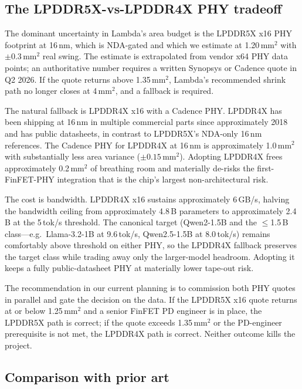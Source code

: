 \documentclass[conference]{IEEEtran}
\begin{document}
\subsection{The LPDDR5X-vs-LPDDR4X PHY tradeoff}

The dominant uncertainty in Lambda's area budget is the LPDDR5X x16 PHY footprint at 16\,nm, which is NDA-gated and which we estimate at 1.20\,mm$^2$ with $\pm 0.3$\,mm$^2$ real swing. The estimate is extrapolated from vendor x64 PHY data points; an authoritative number requires a written Synopsys or Cadence quote in Q2 2026. If the quote returns above 1.35\,mm$^2$, Lambda's recommended shrink path no longer closes at 4\,mm$^2$, and a fallback is required.

The natural fallback is LPDDR4X x16 with a Cadence PHY. LPDDR4X has been shipping at 16\,nm in multiple commercial parts since approximately 2018 and has public datasheets, in contrast to LPDDR5X's NDA-only 16\,nm references. The Cadence PHY for LPDDR4X at 16\,nm is approximately 1.0\,mm$^2$ with substantially less area variance ($\pm 0.15$\,mm$^2$). Adopting LPDDR4X frees approximately 0.2\,mm$^2$ of breathing room and materially de-risks the first-FinFET-PHY integration that is the chip's largest non-architectural risk.

The cost is bandwidth. LPDDR4X x16 sustains approximately 6\,GB/s, halving the bandwidth ceiling from approximately 4.8\,B parameters to approximately 2.4\,B at the 5\,tok/s threshold. The canonical target (Qwen2-1.5B and the $\leq$1.5\,B class---e.g.\ Llama-3.2-1B at 9.6\,tok/s, Qwen2.5-1.5B at 8.0\,tok/s) remains comfortably above threshold on either PHY, so the LPDDR4X fallback preserves the target class while trading away only the larger-model headroom. Adopting it keeps a fully public-datasheet PHY at materially lower tape-out risk.

The recommendation in our current planning is to commission both PHY quotes in parallel and gate the decision on the data. If the LPDDR5X x16 quote returns at or below 1.25\,mm$^2$ and a senior FinFET PD engineer is in place, the LPDDR5X path is correct; if the quote exceeds 1.35\,mm$^2$ or the PD-engineer prerequisite is not met, the LPDDR4X path is correct. Neither outcome kills the project.

\subsection{Comparison with prior art}
\end{document}
